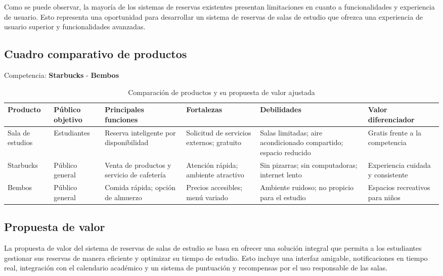 \documentclass{article}
\begin{document}
      Como se puede observar, la mayoría de los sistemas de reservas existentes presentan limitaciones en cuanto a funcionalidades y experiencia de usuario. Esto representa una oportunidad para desarrollar un sistema de reservas de salas de estudio que ofrezca una experiencia de usuario superior y funcionalidades avanzadas.

      \subsection{Cuadro comparativo de productos}

      Competencia: \textbf{Starbucks} - \textbf{Bembos}

\begin{table}[ht]
  \centering
  \scriptsize
  \begin{tabularx}{\textwidth}{|>{\raggedright\arraybackslash}X|>{\raggedright\arraybackslash}X|>{\raggedright\arraybackslash}X|>{\raggedright\arraybackslash}X|>{\raggedright\arraybackslash}X|>{\raggedright\arraybackslash}X|}
  \hline
  \textbf{Producto} & \textbf{Público objetivo} & \textbf{Principales funciones} & \textbf{Fortalezas} & \textbf{Debilidades} & \textbf{Valor diferenciador} \\
  \hline
  Sala de estudios & Estudiantes  & Reserva inteligente por disponibilidad  & Solicitud de servicios externos; gratuito  & Salas limitadas; aire acondicionado compartido; espacio reducido  & Gratis frente a la competencia  \\
  \hline
  Starbucks & Público general  & Venta de productos y servicio de cafetería  & Atención rápida; ambiente atractivo  & Sin pizarras; sin computadoras; internet lento  & Experiencia cuidada y consistente  \\
  \hline
  Bembos & Público general  & Comida rápida; opción de almuerzo  & Precios accesibles; menú variado  & Ambiente ruidoso; no propicio para el estudio  & Espacios recreativos para niños  \\
  \hline
  \end{tabularx}
  \caption{Comparación de productos y su propuesta de valor ajustada}
  \label{tab:comparacion-productos}
  \end{table}

      \subsection{Propuesta de valor}

      La propuesta de valor del sistema de reservas de salas de estudio se basa en ofrecer una solución integral que permita a los estudiantes gestionar sus reservas de manera eficiente y optimizar su tiempo de estudio. Esto incluye una interfaz amigable, notificaciones en tiempo real, integración con el calendario académico y un sistema de puntuación y recompensas por el uso responsable de las salas.
\end{document}
